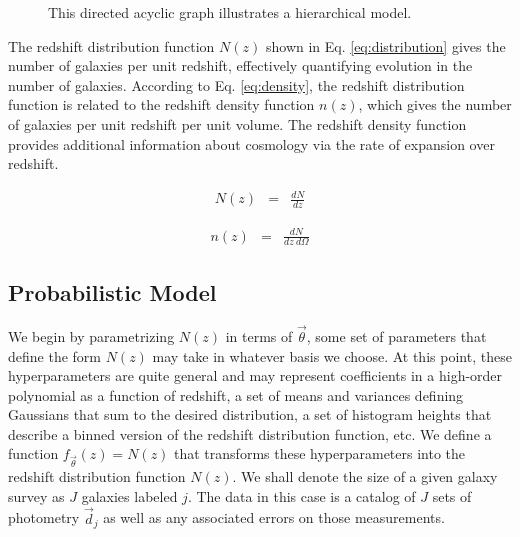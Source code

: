 \documentclass[preprint]{aastex}
\begin{document}
\begin{figure}
\vspace{0.5cm}
\begin{center}
\caption{This directed acyclic graph illustrates a hierarchical model.}
\label{fig:flow}
\end{center}
\end{figure}

The redshift distribution function $N(z)$ shown in Eq. \ref{eq:distribution} 
gives the number of galaxies per unit redshift, effectively quantifying 
evolution in the number of galaxies.  \citep{men13}  According to Eq. 
\ref{eq:density}, the redshift distribution function is related to the redshift 
density function $n(z)$, which gives the number of galaxies per unit redshift 
per unit volume.  The redshift density function provides additional information 
about cosmology via the rate of expansion over redshift.

\begin{eqnarray}
\label{eq:distribution}
N(z) &=& \frac{dN}{dz}
\end{eqnarray}

\begin{eqnarray}
\label{eq:density}
n(z) &=& \frac{dN}{dz\ d\Omega}
\end{eqnarray}

\clearpage
\subsection{Probabilistic Model}
\label{sec:prob}

We begin by parametrizing $N(z)$ in terms of $\vec{\theta}$, some set of 
parameters that define the form $N(z)$ may take in whatever basis we choose.  
At this point, these hyperparameters are quite general and may represent 
coefficients in a high-order polynomial as a function of redshift, a set of 
means and variances defining Gaussians that sum to the desired distribution, a 
set of histogram heights that describe a binned version of the redshift 
distribution function, etc.  We define a function $f_{\vec{\theta}}(z)=N(z)$ 
that transforms these hyperparameters into the redshift distribution function 
$N(z)$.  We shall denote the size of a given galaxy survey as $J$ galaxies 
labeled $j$.  The data in this case is a catalog of $J$ sets of photometry 
$\vec{d}_{j}$ as well as any associated errors on those measurements.  
\end{document}
